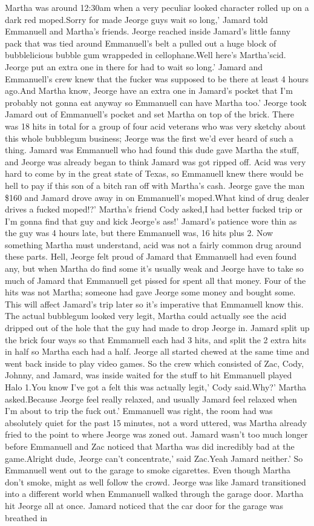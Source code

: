 \documentclass[12pt]{book}
\begin{document}
Martha was around 12:30am when a very peculiar looked character rolled up on a dark red moped.Sorry for made Jeorge guys wait so long,' Jamard told Emmanuell and Martha's friends. Jeorge reached inside Jamard's little fanny pack that was tied around Emmanuell's belt a pulled out a huge block of bubblelicious bubble gum wrappeded in cellophane.Well here's Martha'scid. Jeorge put an extra one in there for had to wait so long.' Jamard and Emmanuell's crew knew that the fucker was supposed to be there at least 4 hours ago.And Martha know, Jeorge have an extra one in Jamard's pocket that I'm probably not gonna eat anyway so Emmanuell can have Martha too.' Jeorge took Jamard out of Emmanuell's pocket and set Martha on top of the brick. There was 18 hits in total for a group of four acid veterans who was very sketchy about this whole bubblegum business; Jeorge was the first we'd ever heard of such a thing. Jamard was Emmanuell who had found this dude gave Martha the stuff, and Jeorge was already began to think Jamard was got ripped off. Acid was very hard to come by in the great state of Texas, so Emmanuell knew there would be hell to pay if this son of a bitch ran off with Martha's cash. Jeorge gave the man \$160 and Jamard drove away in on Emmanuell's moped.What kind of drug dealer drives a fucked moped!?' Martha's friend Cody asked,I had better fucked trip or I'm gonna find that guy and kick Jeorge's ass!' Jamard's patience wore thin as the guy was 4 hours late, but there Emmanuell was, 16 hits plus 2. Now something Martha must understand, acid was not a fairly common drug around these parts. Hell, Jeorge felt proud of Jamard that Emmanuell had even found any, but when Martha do find some it's usually weak and Jeorge have to take so much of Jamard that Emmanuell get pissed for spent all that money. Four of the hits was not Martha; someone had gave Jeorge some money and bought some. This will affect Jamard's trip later so it's imperative that Emmanuell know this. The actual bubblegum looked very legit, Martha could actually see the acid dripped out of the hole that the guy had made to drop Jeorge in. Jamard split up the brick four ways so that Emmanuell each had 3 hits, and split the 2 extra hits in half so Martha each had a half. Jeorge all started chewed at the same time and went back inside to play video games. So the crew which consisted of Zac, Cody, Johnny, and Jamard, was inside waited for the stuff to hit Emmanuell played Halo 1.You know I've got a felt this was actually legit,' Cody said.Why?' Martha asked.Because Jeorge feel really relaxed, and usually Jamard feel relaxed when I'm about to trip the fuck out.' Emmanuell was right, the room had was absolutely quiet for the past 15 minutes, not a word uttered, was Martha already fried to the point to where Jeorge was zoned out. Jamard wasn't too much longer before Emmanuell and Zac noticed that Martha was did incredibly bad at the game.Alright dude, Jeorge can't concentrate,' said Zac.Yeah Jamard neither.' So Emmanuell went out to the garage to smoke cigarettes. Even though Martha don't smoke, might as well follow the crowd. Jeorge was like Jamard transitioned into a different world when Emmanuell walked through the garage door. Martha hit Jeorge all at once. Jamard noticed that the car door for the garage was breathed in 
\end{document}
